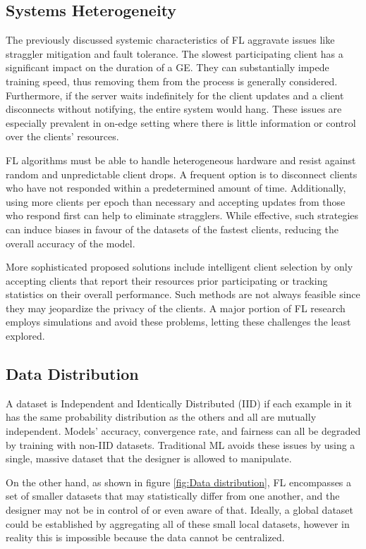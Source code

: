 \subsection{Systems Heterogeneity}
The previously discussed systemic characteristics of FL aggravate issues like straggler mitigation and fault tolerance. The slowest participating client has a significant impact on the duration of a GE. They can substantially impede training speed, thus removing them from the process is generally considered. Furthermore, if the server waits indefinitely for the client updates and a client disconnects without notifying, the entire system would hang. These issues are especially prevalent in on-edge setting where there is little information or control over the clients' resources.

FL algorithms must be able to handle heterogeneous hardware and resist against random and unpredictable client drops. A frequent option is to disconnect clients who have not responded within a predetermined amount of time. Additionally, using more clients per epoch than necessary and accepting updates from those who respond first can help to eliminate stragglers. While effective, such strategies can induce biases in favour of the datasets of the fastest clients, reducing the overall accuracy of the model.

More sophisticated proposed solutions include intelligent client selection by only accepting clients that report their resources prior participating or tracking statistics on their overall performance. Such methods are not always feasible since they may jeopardize the privacy of the clients. A major portion of FL research employs simulations and avoid these problems, letting these challenges the least explored.

\subsection{Data Distribution}
\label{susbsection: Data distribution}
A dataset is Independent and Identically Distributed (IID) if each example in it has the same probability distribution as the others and all are mutually independent. Models' accuracy, convergence rate, and fairness can all be degraded by training with non-IID datasets. Traditional ML avoids these issues by using a single, massive dataset that the designer is allowed to manipulate.

On the other hand, as shown in figure \ref{fig:Data distribution}, FL encompasses a set of smaller datasets that may statistically differ from one another, and the designer may not be in control of or even aware of that. Ideally, a global dataset could be established by aggregating all of these small local datasets, however in reality this is impossible because the data cannot be centralized.

